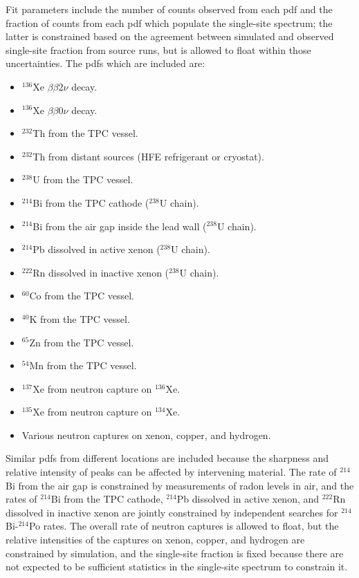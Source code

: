 Fit parameters include the number of counts observed from each pdf and the fraction of counts from each pdf which populate the single-site spectrum; the latter is constrained based on the agreement between simulated and observed single-site fraction from source runs, but is allowed to float within those uncertainties.  The pdfs which are included are:
\begin{itemize}
\item $^{136}$Xe $\beta\beta 2\nu$ decay.
\item $^{136}$Xe $\beta\beta 0\nu$ decay.
\item $^{232}$Th from the TPC vessel.
\item $^{232}$Th from distant sources (HFE refrigerant or cryostat).
\item $^{238}$U from the TPC vessel.
\item $^{214}$Bi from the TPC cathode ($^{238}$U chain).
\item $^{214}$Bi from the air gap inside the lead wall ($^{238}$U chain).
\item $^{214}$Pb dissolved in active xenon ($^{238}$U chain).
\item $^{222}$Rn dissolved in inactive xenon ($^{238}$U chain).
\item $^{60}$Co from the TPC vessel.
\item $^{40}$K from the TPC vessel.
\item $^{65}$Zn from the TPC vessel.
\item $^{54}$Mn from the TPC vessel.
\item $^{137}$Xe from neutron capture on $^{136}$Xe.
\item $^{135}$Xe from neutron capture on $^{134}$Xe.
\item Various neutron captures on xenon, copper, and hydrogen.
\end{itemize}
Similar pdfs from different locations are included because the sharpness and relative intensity of peaks can be affected by intervening material.  The rate of $^{214}$Bi from the air gap is constrained by measurements of radon levels in air, and the rates of $^{214}$Bi from the TPC cathode, $^{214}$Pb dissolved in active xenon, and $^{222}$Rn dissolved in inactive xenon are jointly constrained by independent searches for $^{214}$Bi-$^{214}$Po rates.  The overall rate of neutron captures is allowed to float, but the relative intensities of the captures on xenon, copper, and hydrogen are constrained by simulation, and the single-site fraction is fixed because there are not expected to be sufficient statistics in the single-site spectrum to constrain it.~\cite{FittingDocument}

